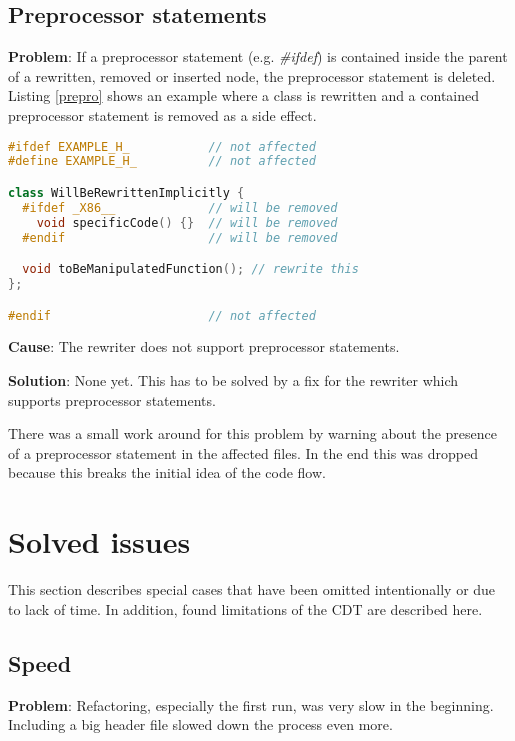 \subsection{Preprocessor statements}
\textbf{Problem}: If a preprocessor statement (e.g. \textit{\#ifdef}) is
contained inside the parent of a rewritten, removed or inserted node, the
preprocessor statement is deleted. Listing \ref{prepro} shows an example where a
class is rewritten and a contained preprocessor statement is removed as a side
effect.

\begin{lstlisting}[caption={Jeopardized preprocessor statement inside a class},
label={prepro}, language=C++]
#ifdef EXAMPLE_H_           // not affected
#define EXAMPLE_H_          // not affected

class WillBeRewrittenImplicitly {
  #ifdef _X86__             // will be removed
    void specificCode() {}  // will be removed
  #endif                    // will be removed

  void toBeManipulatedFunction(); // rewrite this
};

#endif                      // not affected
\end{lstlisting}

\textbf{Cause}: The rewriter does not support preprocessor statements.

\textbf{Solution}: None yet. This has to be solved by a fix for the rewriter
which supports preprocessor statements.

There was a small work around for this problem by warning about the presence of
a preprocessor statement in the affected files. In the end this was dropped
because this breaks the initial idea of the code flow.

\section{Solved issues}

This section describes special cases that have been omitted intentionally or due 
to lack of time. In addition, found limitations of the CDT are described here.

\subsection{Speed}
\textbf{Problem}: Refactoring, especially the first run, was very slow in the 
beginning. Including a big header file slowed down the process even more.

